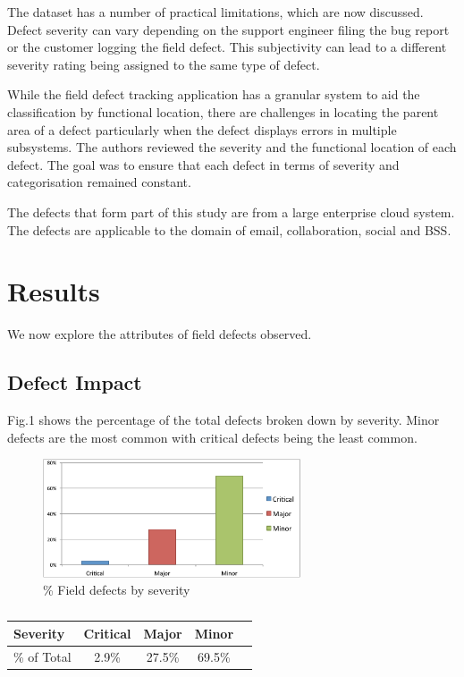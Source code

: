 \documentclass[conference]{IEEEtran}
\begin{document}
The dataset has a number of practical limitations, which are now discussed. Defect severity can vary depending on the support engineer filing the bug report or the customer logging the field defect. This subjectivity can lead to a different severity rating being assigned to the same type of defect. \par
While the field defect tracking application has a granular system to aid the classification by functional location, there are challenges in locating the parent area of a defect particularly when the defect displays errors in multiple subsystems.
The authors reviewed the severity and the functional location of each defect. The goal was to ensure that each defect in terms of severity and categorisation remained constant. \par
The defects that form part of this study are from a large enterprise cloud system. The defects are applicable to the domain of email, collaboration, social and BSS.

\section{Results}

We now explore the attributes of field defects observed.

\subsection{Defect Impact}

Fig.1 shows the percentage of the total defects broken down by severity. Minor defects are the most common with critical defects being the least common.

\begin{figure}
\begin{center}
\includegraphics[height=3.5cm]{graphs/graph1.pdf} 
\caption{\% Field defects by severity}
\end{center}
\label{fig:defectimpact}
\end{figure}


\begin {table}
\caption {}
\begin{center}
\begin{tabular}{l*{3}{c}r} Severity & Critical & Major & Minor \\ \hline \% of Total  & 2.9\% & 27.5\% & 69.5\% \end{tabular}
\end{center}
\end{table}
\end{document}
